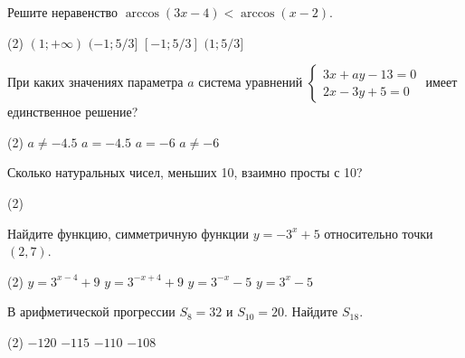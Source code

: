 \documentclass[14pt]{article}
\begin{document}
\begin{taskbox}
Решите неравенство $\arccos(3x - 4) < \arccos(x - 2)$.
 \vspace{0.2cm} \begin{tasks}(2)
\task $(1; +\infty)$
\task $(-1; 5/3]$
\task $[-1; 5/3]$
\task $(1; 5/3]$
\end{tasks}
\vspace{2cm}
\end{taskbox}

\begin{taskbox}
При каких значениях параметра $a$ система уравнений $\begin{cases} 3x + ay - 13 = 0 \\ 2x - 3y + 5 = 0 \end{cases}$ имеет единственное решение?
 \vspace{0.2cm} \begin{tasks}(2)
\task $a \neq -4.5$
\task $a = -4.5$
\task $a = -6$
\task $a \neq -6$
\end{tasks}
\vspace{2cm}
\end{taskbox}


\begin{taskbox}
Сколько натуральных чисел, меньших 10, взаимно просты с 10?
 \vspace{0.2cm} \begin{tasks}(2)
\end{tasks}
\vspace{2cm}
\end{taskbox}


\begin{taskbox}
Найдите функцию, симметричную функции $y = -3^x + 5$ относительно точки $(2,7)$.
 \vspace{0.2cm} \begin{tasks}(2)
\task $y = 3^{x-4} + 9$
\task $y = 3^{-x+4} + 9$
\task $y = 3^{-x} - 5$
\task $y = 3^{x} - 5$
\end{tasks}
\vspace{2cm}
\end{taskbox}


\begin{taskbox}
В арифметической прогрессии $S_8 = 32$ и $S_{10} = 20$. Найдите $S_{18}$.
 \vspace{0.2cm} \begin{tasks}(2)
\task $-120$
\task $-115$
\task $-110$
\task $-108$
\end{tasks}
\vspace{2cm}
\end{taskbox}
\end{document}
